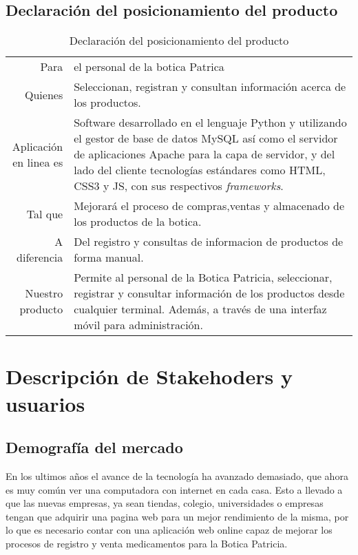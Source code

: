 \documentclass[a4paper,11pt, spanish]{report}
\makeatletter
\newcommand{\celda}[3][t]{%
  \begin{tabular}[#1]{@{}#2@{}}#3\end{tabular}}
\makeatother
\begin{document}
{      \subsection{Declaración del posicionamiento del producto}
      {\renewcommand{\arraystretch}{1.5}%
      \noindent\begin{table}[H]
      \noindent\begin{tabularx}{\textwidth}{r|X}
        Para & el personal de la botica Patrica\\
        Quienes & Seleccionan, registran y consultan información acerca de los productos.\\
        \celda{r}{Aplicación \\ en linea es} & Software desarrollado en el lenguaje Python y utilizando el gestor de base de datos MySQL así como el servidor de aplicaciones Apache para la capa de servidor, y del lado del cliente tecnologías estándares como HTML, CSS3 y JS, con sus respectivos \textit{frameworks}.\\
        Tal que & Mejorará el proceso de compras,ventas y almacenado de los productos de la botica.\\
        A diferencia & Del registro y consultas de informacion de productos de forma manual.\\
        \celda{r}{Nuestro \\ producto} & Permite al personal de la Botica Patricia, seleccionar, registrar y consultar información de los productos desde cualquier terminal. Además, a través de una interfaz móvil para administración.\\
      \end{tabularx}
      \caption{Declaración del posicionamiento del producto}
      \end{table}
    \section{Descripción de Stakehoders y usuarios}
      \subsection{Demografía del mercado}
        En los ultimos años el avance de la tecnología ha avanzado demasiado, que ahora es muy común ver una computadora con internet en cada casa.
        Esto a llevado a que las nuevas empresas, ya sean tiendas, colegio, universidades o empresas tengan que adquirir una pagina web para un mejor rendimiento de la misma, por lo que es necesario contar con una aplicación web online capaz de mejorar los procesos de registro y venta medicamentos para la Botica Patricia.
}}
\end{document}
